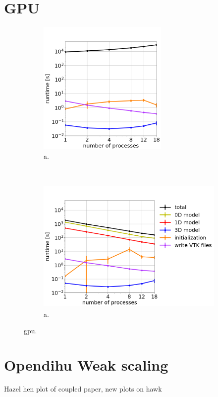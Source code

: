 \section{GPU}

\begin{figure}%
  \centering%
  \begin{subfigure}[t]{0.48\textwidth}%
    \centering%
    \includegraphics[height=6.5cm]{images/results/studies/16_hodgkin_huxley_gpu.png}%
    \caption{a.}%
    \label{fig:16_hodgkin_huxley_gpu}%
  \end{subfigure}
  \,
  \begin{subfigure}[t]{0.48\textwidth}%
    \centering%
    \includegraphics[height=6.5cm]{images/results/studies/16_hodgkin_huxley_cpu.png}%
    \caption{a.}%
    \label{fig:16_hodgkin_huxley_cpu}%
  \end{subfigure}   
  \caption{gpu.}%
  \label{fig:16_hodgkin_huxley_cpu_gpu}%
\end{figure}%

\section{Opendihu Weak scaling}
Hazel hen plot of coupled paper, new plots on hawk
